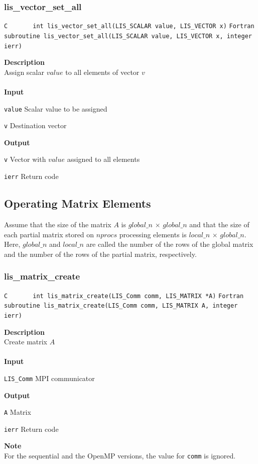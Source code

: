 \documentclass[a4paper]{article}
\newcommand{\namelistlabel}[1]{\mbox{#1}\hfill}
\newenvironment{namelist}[1]{%
 \begin{list}{}
  {\let\makelabel\namelistlabel
  \settowidth{\labelwidth}{#1}
  \setlength{\leftmargin}{1.1\labelwidth}}
}{%
\end{list}}
\begin{document}
  \subsubsection{lis\_vector\_set\_all}
\begin{screen}
\verb|C       int lis_vector_set_all(LIS_SCALAR value, LIS_VECTOR x)|
\verb|Fortran subroutine lis_vector_set_all(LIS_SCALAR value, LIS_VECTOR x, integer ierr)|
\end{screen}
{\bf Description}\\
\indent
Assign scalar $value$ to all elements of vector $v$
\\ \\
\noindent
{\bf Input}
\begin{namelist}{XXXXXXXXXXXXXXXXXXXX}
\item[\tt value] Scalar value to be assigned
\item[\tt v] Destination vector
\end{namelist}
{\bf Output}
\begin{namelist}{XXXXXXXXXXXXXXXXXXXX}
\item[\tt v] Vector with $value$ assigned to all elements
\item[\tt ierr] Return code
\end{namelist}
\newpage
\subsection{Operating Matrix Elements}
Assume that the size of the matrix $A$ is $global\_n$ $\times$ $global\_n$
and that the size of each partial matrix stored on $nprocs$ 
processing elements is $local\_n$ $\times$ $global\_n$. Here, $global\_n$
and $local\_n$ are called the number of the rows of the global matrix
and the number of the rows of the partial matrix, respectively. 
  \subsubsection{lis\_matrix\_create}
\begin{screen}
\verb|C       int lis_matrix_create(LIS_Comm comm, LIS_MATRIX *A)|
\verb|Fortran subroutine lis_matrix_create(LIS_Comm comm, LIS_MATRIX A, integer ierr)|
\end{screen}
{\bf Description}\\
\indent
Create matrix $A$
\\ \\
\noindent
{\bf Input}
\begin{namelist}{XXXXXXXXXXXXXXXXXXXX}
\item[\tt LIS\_Comm] MPI communicator
\end{namelist}
{\bf Output}
\begin{namelist}{XXXXXXXXXXXXXXXXXXXX}
\item[\tt A] Matrix
\item[\tt ierr] Return code
\end{namelist}
{\bf Note}\\
\indent
For the sequential and the OpenMP versions, the value for {\tt comm} is ignored. 
\end{document}
